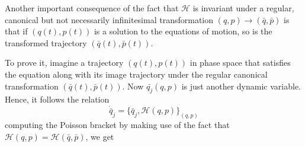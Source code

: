 \documentclass[12pt,a4paper]{report}
\newcommand{\hamiltonian}{\mathcal{H}}
\begin{document}
Another important consequence of the fact that $\hamiltonian$ is invariant under a regular, canonical but not necessarily infinitesimal transformation $(q, p) \to (\bar{q}, \bar{p})$
is that if $(q(t), p(t))$ is a solution to the equations of motion, so is the transformed trajectory $(\bar{q}(t), \bar{p}(t))$.

To prove it, imagine a trajectory $(q(t), p(t))$ in phase space that satisfies the equation along with its image trajectory under the regular canonical transformation $(\bar{q}(t), \bar{p}(t))$.
Now $\bar{q_j}(q, p)$ is just another dynamic variable. Hence, it follows the relation
\begin{equation*}
    \dot{\bar{q}}_j = \{\bar{q}_j, \hamiltonian(q, p)\}_{(q, p)}
\end{equation*}
computing the Poisson bracket by making use of the fact that $\hamiltonian(q, p) = \hamiltonian(\bar{q}, \bar{p})$, we get
\end{document}
